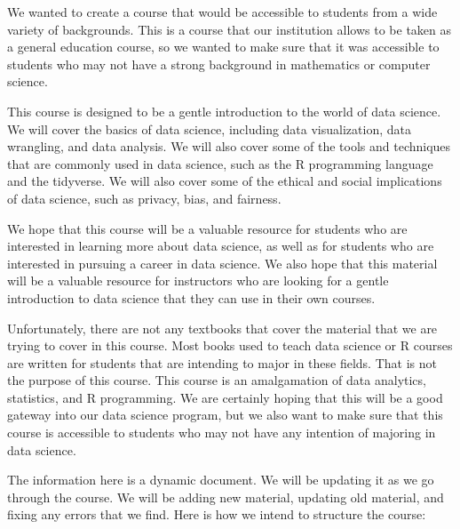 \documentclass[
  letterpaper,
  DIV=11,
  numbers=noendperiod]{scrreprt}
\begin{document}
We wanted to create a course that would be accessible to students from a
wide variety of backgrounds. This is a course that our institution
allows to be taken as a general education course, so we wanted to make
sure that it was accessible to students who may not have a strong
background in mathematics or computer science.

This course is designed to be a gentle introduction to the world of data
science. We will cover the basics of data science, including data
visualization, data wrangling, and data analysis. We will also cover
some of the tools and techniques that are commonly used in data science,
such as the R programming language and the tidyverse. We will also cover
some of the ethical and social implications of data science, such as
privacy, bias, and fairness.

We hope that this course will be a valuable resource for students who
are interested in learning more about data science, as well as for
students who are interested in pursuing a career in data science. We
also hope that this material will be a valuable resource for instructors
who are looking for a gentle introduction to data science that they can
use in their own courses.

Unfortunately, there are not any textbooks that cover the material that
we are trying to cover in this course. Most books used to teach data
science or R courses are written for students that are intending to
major in these fields. That is not the purpose of this course. This
course is an amalgamation of data analytics, statistics, and R
programming. We are certainly hoping that this will be a good gateway
into our data science program, but we also want to make sure that this
course is accessible to students who may not have any intention of
majoring in data science.

The information here is a dynamic document. We will be updating it as we
go through the course. We will be adding new material, updating old
material, and fixing any errors that we find. Here is how we intend to
structure the course:
\end{document}
